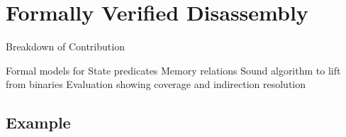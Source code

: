 \section{Formally Verified Disassembly}
\begin{frame}{Breakdown of Contribution}
  \begin{outline}[enumerate] %
    \1<+-> \alert{Formal models} for
      \2 State predicates
      \2 Memory relations
    \1<+-> \alert{Sound algorithm} to lift  from binaries
    \1<+-> \alert{Evaluation} showing coverage and indirection resolution
  \end{outline}
\end{frame}

\subsection{Example}

